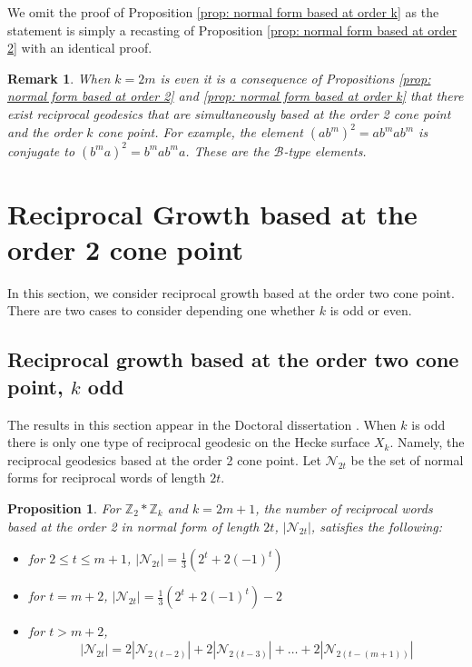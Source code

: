 \documentclass[11pt]{amsart}
\numberwithin{equation}{section}
\theoremstyle{plain}
\newtheorem{prop}[thm]{Proposition}
\newtheorem{rem}[thm]{Remark}
\begin{document}
  We omit the proof of  Proposition  \ref{prop: normal form based at order k}   as the statement is simply a recasting of  
  Proposition  \ref{prop: normal form based at order 2}
 with an identical proof. 
 
 \begin{rem}\label{rem: simultaneously in both}
 When $k=2m$ is even it is a consequence of  Propositions  \ref{prop: normal form based at order 2} and 
 \ref{prop: normal form based at order k}
that there exist 
 reciprocal geodesics that are simultaneously based at the order 2 cone point and the order $k$ cone point. For example,  the element
 $(ab^{m})^2 =ab^{m}ab^{m}$ is conjugate to 
 $(b^{m}a)^{2}=b^{m}ab^{m}a$. These are the $\mathcal{B}$-type elements. 
 \end{rem}
  
 
 
   
  \section{Reciprocal Growth based at the order 2 cone point}
   \label{sec: rec. growth based at order 2}
  In this section, we consider reciprocal growth based at the order two cone point. There are two cases to consider depending one whether $k$ is odd or even. 

  \subsection{Reciprocal growth based at the order two cone point, $k$ odd}
  The results in this section appear in the Doctoral  dissertation   \cite{Mar}.
  When $k$ is odd there is only one type of reciprocal geodesic on the Hecke surface $X_{k}$. Namely, the reciprocal geodesics  based at the order 2 cone point. 
  Let $\mathcal{N}_{2t}$ be the set of normal forms for reciprocal words of length $2t$. 
  
  \begin{prop}\label{thm:recurrencerelationkodd}
  	For $\mathbb{Z}_{2} * \mathbb{Z}_{k}$ and $k=2m+1$, the number of reciprocal words based at the order 2  in normal form of length $2t$, $|\mathcal{N}_{2t}|$, satisfies the following:
  	
  	\begin{itemize}
  		\item [(i)]  for $2 \leq t \leq m + 1$, $|\mathcal{N}_{2t}| = \frac{1}{3}(2^{t}+2(-1)^{t})$
  		\item [(ii)]  for $t = m + 2$, $|\mathcal{N}_{2t}| = \frac{1}{3}(2^{t}+2(-1)^{t}) - 2$
  		\item [(iii)]  for $t > m + 2$, 
\begin{equation}\label{eq: recurrence relation}
|\mathcal{N}_{2t}| = 2|\mathcal{N}_{2(t-2)}| + 2|\mathcal{N}_{2(t-3)}| + \dots + 2|\mathcal{N}_{2(t-(m+1))}|
\end{equation}
  		
  	\end{itemize}
  	
  	
  \end{prop}
\end{document}
